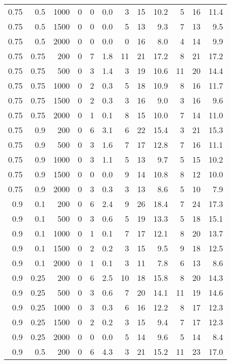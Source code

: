 \documentclass[a4paper, 12pt]{extreport}
\begin{document}
\begin{longtable}{|r|r|r|r|r|r|r|r|r|r|r|r|}
0.75 & 0.5 & 1000 & 0 & 0 & 0.0 & 3 & 15 & 10.2 & 5 & 16 & 11.4 \\ 
0.75 & 0.5 & 1500 & 0 & 0 & 0.0 & 5 & 13 & 9.3 & 7 & 13 & 9.5 \\ 
0.75 & 0.5 & 2000 & 0 & 0 & 0.0 & 0 & 16 & 8.0 & 4 & 14 & 9.9 \\ 
\hline
0.75 & 0.75 & 200 & 0 & 7 & 1.8 & 11 & 21 & 17.2 & 8 & 21 & 17.2 \\ 
0.75 & 0.75 & 500 & 0 & 3 & 1.4 & 3 & 19 & 10.6 & 11 & 20 & 14.4 \\ 
0.75 & 0.75 & 1000 & 0 & 2 & 0.3 & 5 & 18 & 10.9 & 8 & 16 & 11.7 \\ 
0.75 & 0.75 & 1500 & 0 & 2 & 0.3 & 3 & 16 & 9.0 & 3 & 16 & 9.6 \\ 
0.75 & 0.75 & 2000 & 0 & 1 & 0.1 & 8 & 15 & 10.0 & 7 & 14 & 11.0 \\ 
\hline
0.75 & 0.9 & 200 & 0 & 6 & 3.1 & 6 & 22 & 15.4 & 3 & 21 & 15.3 \\ 
0.75 & 0.9 & 500 & 0 & 3 & 1.6 & 7 & 17 & 12.8 & 7 & 16 & 11.1 \\ 
0.75 & 0.9 & 1000 & 0 & 3 & 1.1 & 5 & 13 & 9.7 & 5 & 15 & 10.2 \\ 
0.75 & 0.9 & 1500 & 0 & 0 & 0.0 & 9 & 14 & 10.8 & 8 & 12 & 10.0 \\ 
0.75 & 0.9 & 2000 & 0 & 3 & 0.3 & 3 & 13 & 8.6 & 5 & 10 & 7.9 \\ 
\hline
0.9 & 0.1 & 200 & 0 & 6 & 2.4 & 9 & 26 & 18.4 & 7 & 24 & 17.3 \\ 
0.9 & 0.1 & 500 & 0 & 3 & 0.6 & 5 & 19 & 13.3 & 5 & 18 & 15.1 \\ 
0.9 & 0.1 & 1000 & 0 & 1 & 0.1 & 7 & 17 & 12.1 & 8 & 20 & 13.7 \\ 
0.9 & 0.1 & 1500 & 0 & 2 & 0.2 & 3 & 15 & 9.5 & 9 & 18 & 12.5 \\ 
0.9 & 0.1 & 2000 & 0 & 1 & 0.1 & 3 & 11 & 7.8 & 6 & 13 & 8.6 \\ 
\hline
0.9 & 0.25 & 200 & 0 & 6 & 2.5 & 10 & 18 & 15.8 & 8 & 20 & 14.3 \\ 
0.9 & 0.25 & 500 & 0 & 3 & 0.6 & 7 & 20 & 14.1 & 11 & 19 & 14.6 \\ 
0.9 & 0.25 & 1000 & 0 & 3 & 0.3 & 6 & 16 & 12.2 & 8 & 17 & 12.3 \\ 
0.9 & 0.25 & 1500 & 0 & 2 & 0.2 & 3 & 15 & 9.4 & 7 & 17 & 12.3 \\ 
0.9 & 0.25 & 2000 & 0 & 0 & 0.0 & 5 & 14 & 9.6 & 5 & 14 & 8.4 \\ 
\hline
0.9 & 0.5 & 200 & 0 & 6 & 4.3 & 3 & 21 & 15.2 & 11 & 23 & 17.0 \\ 

\end{longtable}
\end{document}
